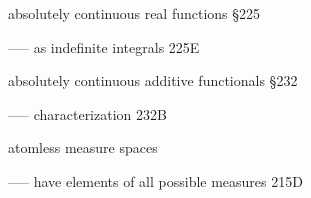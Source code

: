 absolutely continuous real functions \S225

----- as indefinite integrals 225E

absolutely continuous additive functionals \S232

----- characterization 232B
































































atomless measure spaces

----- have elements of all possible measures 215D

















